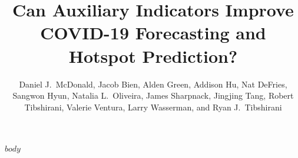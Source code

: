 \documentclass[9pt,twoside,lineno]{pnas-new}
\title{Can Auxiliary Indicators Improve COVID-19 Forecasting and Hotspot  
  Prediction?}
\author{Daniel J.\ McDonald, Jacob Bien, Alden Green, Addison Hu, Nat DeFries, Sangwon Hyun, Natalia L.\ Oliveira, James Sharpnack, Jingjing Tang, Robert Tibshirani, Valerie Ventura, Larry Wasserman, and Ryan J.\ Tibshirani}
\begin{document}
\maketitle

\SItext



$body$





\end{document}
